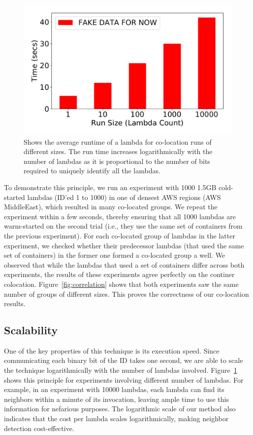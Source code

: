 \begin{figure}[!t]
  \includegraphics[width=.99\linewidth]{fig/runtimes.pdf}
  \caption{Shows the average runtime of a lambda for co-location runs of different sizes. 
  The run time increases logarithmically with the number of lambdas as it is proportional to
  the number of bits required to uniquely identify all the lambdas. 
\label{fig:runtimes}}
\end{figure}

To demonstrate this principle, we run an experiment with 1000 1.5GB cold-started
lambdas (ID'ed 1 to 1000) in one of densest AWS regions (AWS MiddleEast), which
resulted in many co-located groups.  We repeat the experiment within a few
seconds, thereby ensuring that all 1000 lambdas are warm-started on the second
trial (i.e., they use the same set of containers from the previous experiment).
For each co-located group of lambdas in the latter experiment, we checked
whether their predecessor lambdas (that used the same set of containers) in the former one 
formed a co-located group a well.   
We observed that while the lambdas that used a set of containers differ across 
both experiments, the results of these experiments agree perfectly on the continer 
colocation. Figure~\ref{fig:correlation} shows that both experiments saw
the same number of groups of different sizes. This proves the correctness of
our co-location results.

\subsection{Scalability}
One of the key properties of this technique is its execution speed.  Since
communicating each binary bit of the ID takes one second, we are able to scale
the technique logarithmically with the number of lambdas involved.
Figure~\ref{fig:runtimes} shows this principle for experiments involving
different number of lambdas. For example, in an experiment with 10000 lambdas,
each lambda can find its neighbors within a minute of its invocation, leaving
ample time to use this information for nefarious purposes. The logarithmic scale
of our method also indicates that the cost per lambda scales logarithmically,
making neighbor detection cost-effective.



